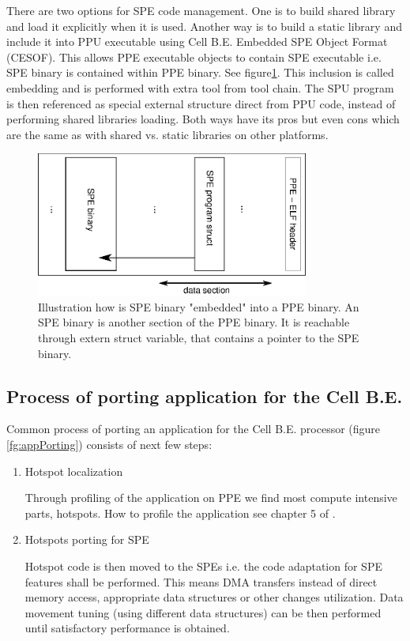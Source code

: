 \par
There are two options for SPE code management.
One is to build shared library and load it explicitly when it is used.
Another way is to build a static library and include it into PPU executable using Cell B.E. Embedded SPE Object Format (CESOF).
This allows PPE executable objects to contain SPE executable i.e. SPE binary is contained within PPE binary. See figure\ref{fg:SPEEmbedding}.
This inclusion is called embedding and is performed with extra tool from tool chain.
The SPU program is then referenced as special external structure direct from PPU code, instead of performing shared libraries loading.
Both ways have its pros but even cons which are the same as with shared vs. static libraries on other platforms.


\begin{figure}
    \centering
    \includegraphics[width=0.8\textwidth]{data/SPEEmbedding}
    \caption[SPE binary embedding]{Illustration how is SPE binary "embedded" into a PPE binary.
An SPE binary is another section of the PPE binary.
It is reachable through extern struct variable, that contains a pointer to the SPE binary.}
    \label{fg:SPEEmbedding}
\end{figure}



\subsection {Process of porting application for the Cell B.E.}
\label{sect:portingProcess}

Common process of porting an application for the Cell B.E. processor (figure \ref{fg:appPorting}) consists of next few steps:
\begin{enumerate}
\item Hotspot localization
\par
Through profiling of the application on PPE we find most compute intensive parts, hotspots.
How to profile the application see chapter 5 of \cite{programmersGuide}.

\item Hotspots porting for SPE
\par
Hotspot code is then moved to the SPEs i.e. the code adaptation for SPE features shall be performed.
This means DMA transfers instead of direct memory access, appropriate data structures or other changes utilization.
Data movement tuning (using different data structures) can be then performed until satisfactory performance is obtained.
\end{enumerate}

